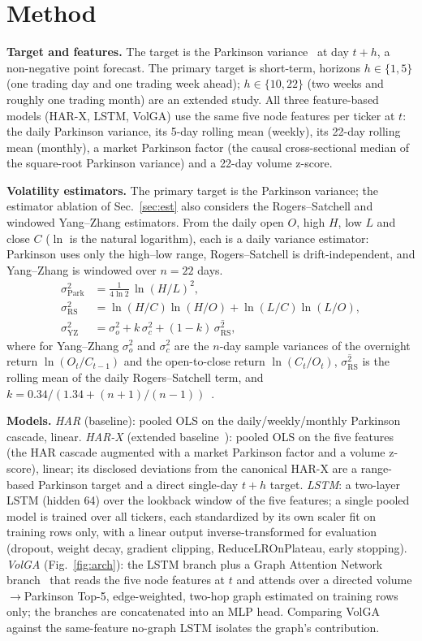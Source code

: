 \documentclass[runningheads]{llncs}
\begin{document}
\section{Method}
\textbf{Target and features.} The target is the Parkinson variance~\cite{parkinson1980} at day
$t{+}h$, a non-negative point forecast. The primary target is short-term, horizons $h\in\{1,5\}$
(one trading day and one trading week ahead); $h\in\{10,22\}$ (two weeks and roughly one trading
month) are an extended study. All three feature-based models (HAR-X, LSTM, VolGA) use the same five
node features per ticker at $t$: the daily Parkinson variance, its 5-day rolling mean (weekly), its
22-day rolling mean (monthly), a market Parkinson factor (the causal cross-sectional median of the
square-root Parkinson variance) and a 22-day volume z-score.

\textbf{Volatility estimators.} The primary target is the Parkinson variance; the estimator ablation
of Sec.~\ref{sec:est} also considers the Rogers--Satchell and windowed Yang--Zhang estimators. From
the daily open $O$, high $H$, low $L$ and close $C$ ($\ln$ is the natural logarithm), each is a daily
variance estimator: Parkinson uses only the high--low range, Rogers--Satchell is drift-independent,
and Yang--Zhang is windowed over $n{=}22$ days.
\begin{align*}
\sigma^2_{\mathrm{Park}} &= \tfrac{1}{4\ln 2}\,\ln(H/L)^2,\\
\sigma^2_{\mathrm{RS}} &= \ln(H/C)\ln(H/O)+\ln(L/C)\ln(L/O),\\
\sigma^2_{\mathrm{YZ}} &= \sigma^2_{o}+k\,\sigma^2_{c}+(1-k)\,\overline{\sigma^2_{\mathrm{RS}}},
\end{align*}
where for Yang--Zhang $\sigma^2_{o}$ and $\sigma^2_{c}$ are the $n$-day sample variances of the
overnight return $\ln(O_t/C_{t-1})$ and the open-to-close return $\ln(C_t/O_t)$,
$\overline{\sigma^2_{\mathrm{RS}}}$ is the rolling mean of the daily Rogers--Satchell term, and
$k=0.34/(1.34+(n{+}1)/(n{-}1))$~\cite{yangzhang2000,rogers1991}.

\textbf{Models.} \emph{HAR} (baseline): pooled OLS on the daily/weekly/monthly Parkinson cascade,
linear. \emph{HAR-X} (extended baseline~\cite{corsi2009,clements2024}): pooled OLS on the five
features (the HAR cascade augmented with a market Parkinson factor and a volume z-score), linear;
its disclosed deviations from the canonical HAR-X are a range-based Parkinson target and a direct
single-day $t{+}h$ target. \emph{LSTM}: a two-layer LSTM (hidden 64) over the lookback window of the
five features; a single pooled model is trained over all tickers, each standardized by its own scaler
fit on training rows only, with a linear output inverse-transformed for evaluation (dropout, weight
decay, gradient clipping, ReduceLROnPlateau, early stopping). \emph{VolGA} (Fig.~\ref{fig:arch}): the
LSTM branch plus a Graph Attention Network branch~\cite{gat2018} that reads the five node features at
$t$ and attends over a directed volume$\to$Parkinson Top-5, edge-weighted, two-hop graph estimated on
training rows only; the branches are concatenated into an MLP head. Comparing VolGA against the
same-feature no-graph LSTM isolates the graph's contribution.
\end{document}
